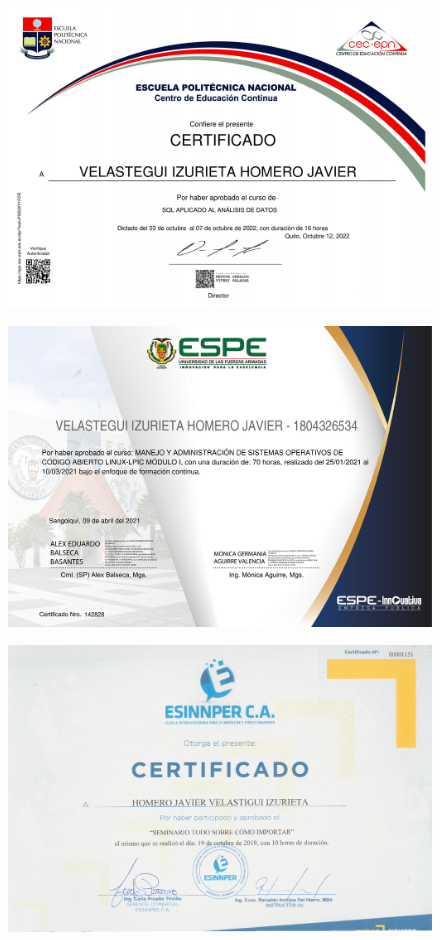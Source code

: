\begin{figure}[ht]
    \setlength{\parindent}{-20pt}
    \includegraphics[width=\textwidth]{2.-Estudios/Certificados/7.pdf}
\end{figure}

\begin{figure}[ht]
    \setlength{\parindent}{-20pt}
    \includegraphics[width=\textwidth]{2.-Estudios/Certificados/6.pdf}
\end{figure}

\begin{figure}[ht]
    \setlength{\parindent}{-20pt}
    \includegraphics[width=\textwidth]{2.-Estudios/Certificados/5.png}
\end{figure}

